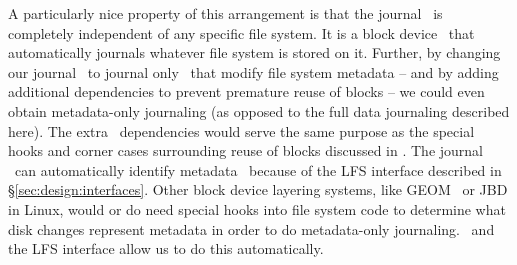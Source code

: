 A particularly nice property of this arrangement is that the journal \module\ is
completely independent of any specific file system. It is a block device
\module\ that automatically journals whatever file system is stored on it.
Further, by changing our journal \module\ to journal only \chdescs\ that modify
file system metadata -- and by adding additional dependencies to prevent
premature reuse of blocks -- we could even obtain metadata-only journaling (as
opposed to the full data journaling described here). The extra \chdesc\
dependencies would serve the same purpose as the special hooks and corner cases
surrounding reuse of blocks discussed in \cite{tweedie00ext3}. The journal
\module\ can automatically identify metadata \chdescs\ because of the LFS
interface described in \S\ref{sec:design:interfaces}. Other block device
layering systems, like GEOM~\cite{geom} or JBD in Linux, would or do need
special hooks into file system code to determine what disk changes represent
metadata in order to do metadata-only journaling. \Chdescs\ and the LFS
interface allow us to do this automatically.
